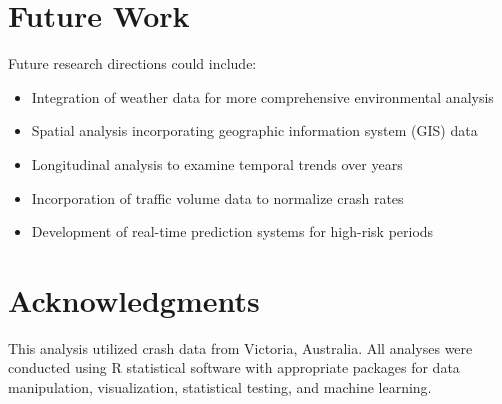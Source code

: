 \documentclass[12pt,a4paper]{article}
\begin{document}
\section{Future Work}

Future research directions could include:
\begin{itemize}
    \item Integration of weather data for more comprehensive environmental analysis
    \item Spatial analysis incorporating geographic information system (GIS) data
    \item Longitudinal analysis to examine temporal trends over years
    \item Incorporation of traffic volume data to normalize crash rates
    \item Development of real-time prediction systems for high-risk periods
\end{itemize}

\section{Acknowledgments}

This analysis utilized crash data from Victoria, Australia. All analyses were conducted using R statistical software with appropriate packages for data manipulation, visualization, statistical testing, and machine learning.
\end{document}
